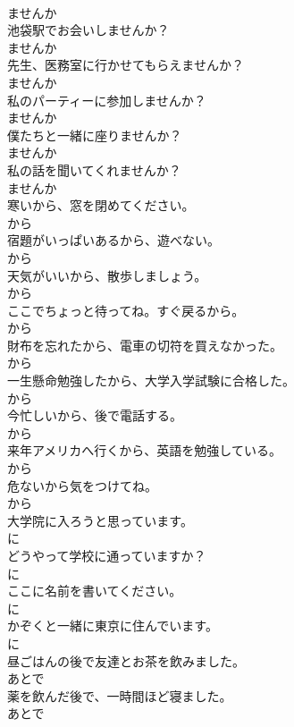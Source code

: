 \documentclass[8pt]{extreport}
\begin{document}
\begin{CJK}{UTF8}{min}
\\	ませんか	
\\	池袋駅でお会いしませんか？	
\\	ませんか	
\\	先生、医務室に行かせてもらえませんか？	
\\	ませんか	
\\	私のパーティーに参加しませんか？	
\\	ませんか	
\\	僕たちと一緒に座りませんか？	
\\	ませんか	
\\	私の話を聞いてくれませんか？	
\\	ませんか	
\\	寒いから、窓を閉めてください。	
\\	から	
\\	宿題がいっぱいあるから、遊べない。	
\\	から	
\\	天気がいいから、散歩しましょう。	
\\	から	
\\	ここでちょっと待ってね。すぐ戻るから。	
\\	から	
\\	財布を忘れたから、電車の切符を買えなかった。	
\\	から	
\\	一生懸命勉強したから、大学入学試験に合格した。	
\\	から	
\\	今忙しいから、後で電話する。	
\\	から	
\\	来年アメリカへ行くから、英語を勉強している。	
\\	から	
\\	危ないから気をつけてね。	
\\	から	
\\	大学院に入ろうと思っています。	
\\	に	
\\	どうやって学校に通っていますか？	
\\	に	
\\	ここに名前を書いてください。	
\\	に	
\\	かぞくと一緒に東京に住んでいます。	
\\	に	
\\	昼ごはんの後で友達とお茶を飲みました。	
\\	あとで	
\\	薬を飲んだ後で、一時間ほど寝ました。	
\\	あとで	

\end{CJK}
\end{document}
